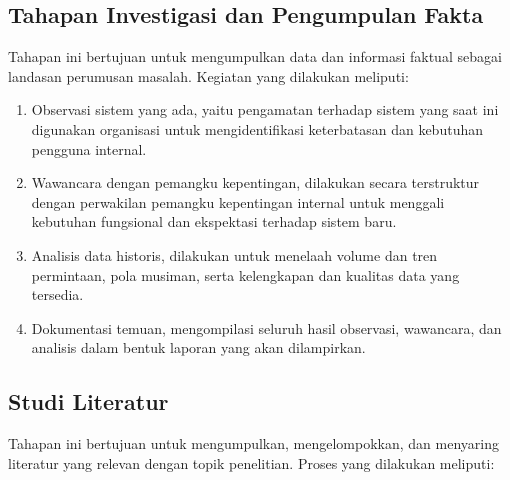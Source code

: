 \subsection{Tahapan Investigasi dan Pengumpulan Fakta}

Tahapan ini bertujuan untuk mengumpulkan data dan informasi faktual sebagai landasan perumusan masalah. Kegiatan yang dilakukan meliputi:

\begin{enumerate}[label=\alph*.]
  \item Observasi sistem yang ada, yaitu pengamatan terhadap sistem yang saat ini digunakan organisasi untuk mengidentifikasi keterbatasan dan kebutuhan pengguna internal.
  
  \item Wawancara dengan pemangku kepentingan, dilakukan secara terstruktur dengan perwakilan pemangku kepentingan internal untuk menggali kebutuhan fungsional dan ekspektasi terhadap sistem baru.
  
  \item Analisis data historis, dilakukan untuk menelaah volume dan tren permintaan, pola musiman, serta kelengkapan dan kualitas data yang tersedia.
  
  \item Dokumentasi temuan, mengompilasi seluruh hasil observasi, wawancara, dan analisis dalam bentuk laporan yang akan dilampirkan.
\end{enumerate}

\subsection{Studi Literatur}

Tahapan ini bertujuan untuk mengumpulkan, mengelompokkan, dan menyaring literatur yang relevan dengan topik penelitian. Proses yang dilakukan meliputi:

